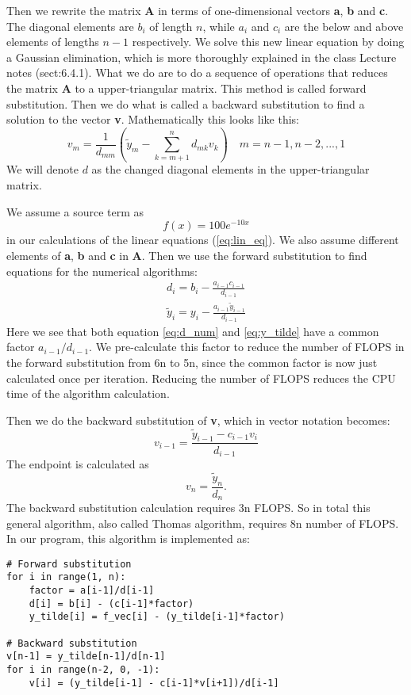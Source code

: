 \documentclass[12pt,a4paper,english]{article}
\begin{document}
Then we rewrite the matrix \textbf{A} in terms of one-dimensional vectors \textbf{a}, \textbf{b} and \textbf{c}. The diagonal elements are $b_i$ of length $n$, while $a_i$ and $c_i$ are the below and above elements of lengths $n-1$ respectively.
We solve this new linear equation by doing a Gaussian elimination, which is more thoroughly explained in the class Lecture notes \cite{notes} (sect:6.4.1). What we do are to do a sequence of operations that reduces the matrix \textbf{A} to a upper-triangular matrix. This method is called forward substitution. Then we do what is called a backward substitution to find a solution to the vector \textbf{v}. Mathematically this looks like this:
\begin{equation}
\label{eq:backward}
v_m = \frac{1}{d_{mm}}\left(\tilde{y}_m-\sum^{n}_{k=m+1}d_{mk}v_k\right)\quad m=n-1, n-2, ..., 1
\end{equation}
We will denote $d$ as the changed diagonal elements in the upper-triangular matrix.

We assume a source term as 
\begin{equation}
\label{eq:source}
f(x)=100e^{-10x}
\end{equation} 
in our calculations of the linear equations (\ref{eq:lin_eq}). We also assume different elements of \textbf{a}, \textbf{b} and \textbf{c} in \textbf{A}. Then we use the forward substitution to find equations for the numerical algorithms:
\begin{align}
\label{eq:d_num}
d_i=b_i-\frac{a_{i-1}c_{i-1}}{d_{i-1}}\\
\label{eq:y_tilde}
\tilde{y}_i = y_i-\frac{a_{i-1}\tilde{y}_{i-1}}{d_{i-1}}
\end{align}
Here we see that both equation \ref{eq:d_num} and \ref{eq:y_tilde} have a common factor $a_{i-1}/d_{i-1}$. We pre-calculate this factor to reduce the number of FLOPS in the forward substitution from 6n to 5n, since the common factor is now just calculated once per iteration. Reducing the number of FLOPS reduces the CPU time of the algorithm calculation.

Then we do the backward substitution of \textbf{v}, which in vector notation becomes:
\begin{equation}
\label{eq:v_back}
v_{i-1} = \frac{\tilde{y}_{i-1}-c_{i-1}v_i}{d_{i-1}}
\end{equation}
The endpoint is calculated as
\[v_n=\frac{\tilde{y}_n}{d_n}.\]
The backward substitution calculation requires 3n FLOPS. So in total this general algorithm, also called Thomas algorithm, requires 8n number of FLOPS. In our program, this algorithm is implemented as:
\begin{lstlisting}
# Forward substitution
for i in range(1, n):
	factor = a[i-1]/d[i-1]
	d[i] = b[i] - (c[i-1]*factor)
	y_tilde[i] = f_vec[i] - (y_tilde[i-1]*factor)

# Backward substitution
v[n-1] = y_tilde[n-1]/d[n-1]
for i in range(n-2, 0, -1):
	v[i] = (y_tilde[i-1] - c[i-1]*v[i+1])/d[i-1]
\end{lstlisting}
\end{document}
